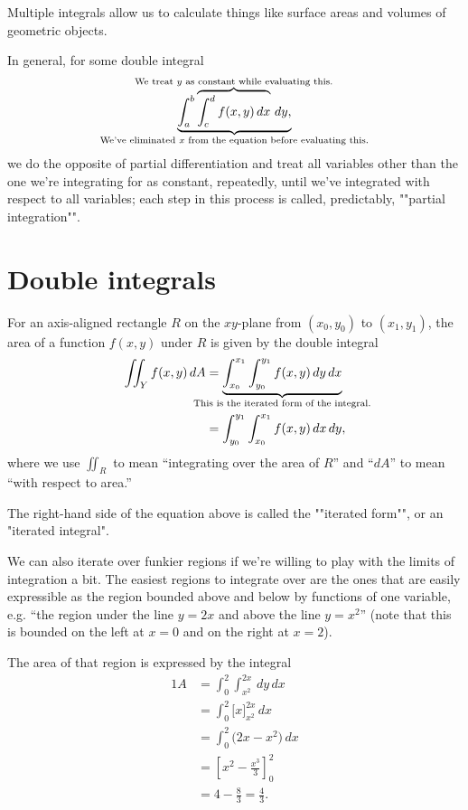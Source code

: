 \documentclass[knowledge]{mathnotes}
\begin{document}
Multiple integrals allow us to calculate things like surface areas and
volumes of geometric objects.

In general, for some double integral
\[\underbrace{\int_a^b \overbrace{\int_c^d f(x,y)\,dx}^{\mathclap{\text{We
treat $y$ as constant while evaluating this.}}}\,dy,}_{\mathclap{\text{We've
eliminated $x$ from the equation before evaluating this.}}}\]
we do the opposite of partial differentiation and treat all variables other
than the one we're integrating for as constant, repeatedly, until we've
integrated with respect to all variables; each step in this process is
called, predictably, ""partial integration"".

\section{Double integrals}
For an axis-aligned rectangle $R$ on the $xy$-plane from $(x_0, y_0)$ to $(x_1,
y_1)$, the area of a function $f(x, y)$ under $R$ is given by the double
integral
\begin{alignat*}{1}
  \iint_{Y} f(x,y)\,dA &= \underbrace{\int_{x_0}^{x_1} \int_{y_0}^{y_1}
    f(x,y)\,dy\,dx}_{\mathclap{\text{This is the iterated form of the
    integral.}}} \\
    &= \int_{y_0}^{y_1} \int_{x_0}^{x_1} f(x,y)\,dx\,dy, \\
\end{alignat*}
where we use $\iint_R$ to mean ``integrating over the area of $R$'' and
``$dA$'' to mean ``with respect to area.''

The right-hand side of the equation above is called the ""iterated form"",
or an \reintro*"iterated integral".

We can also iterate over funkier regions if we're willing to play with the
limits of integration a bit. The easiest regions to integrate over are the
ones that are easily expressible as the region bounded above and below by
functions of one variable, e.g. ``the region under the line $y = 2x$ and
above the line $y = x^2$'' (note that this is bounded on the left at $x = 0$
and on the right at $x = 2$).

The area of that region is expressed by the integral
\begin{alignat*}{1}
  A &= \int_0^2 \int_{x^2}^{2x}\,dy\,dx \\
    &= \int_0^2 {\bigg[ x \bigg]}_{x^2}^{2x}\,dx \\
    &= \int_0^2 {\bigg( 2x-x^2 \bigg)}\,dx \\
    &= {\left[ x^2 - \frac{x^3}{3} \right]}_0^2 \\
    &= 4 - \frac{8}{3} = \frac{4}{3}.
\end{alignat*}
\end{document}
